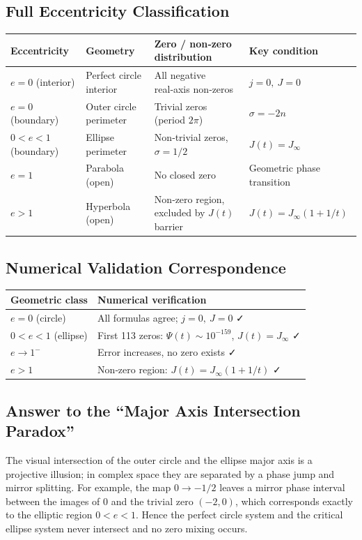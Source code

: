 \documentclass[12pt,a4paper]{article}
\begin{document}
\subsection{Full Eccentricity Classification}\label{app:A2}

\begin{tabularx}{\textwidth}{lXlX}
\toprule
Eccentricity & Geometry & Zero / non‑zero distribution & Key condition \\
\midrule
$e=0$ (interior) & Perfect circle interior & All negative real‑axis non‑zeros & $j=0,\ J=0$ \\
$e=0$ (boundary) & Outer circle perimeter & Trivial zeros (period $2\pi$) & $\sigma = -2n$ \\
$0<e<1$ (boundary) & Ellipse perimeter & Non‑trivial zeros, $\sigma=1/2$ & $J(t)=J_\infty$ \\
$e=1$ & Parabola (open) & No closed zero & Geometric phase transition \\
$e>1$ & Hyperbola (open) & Non‑zero region, excluded by $J(t)$ barrier & $J(t)=J_\infty(1+1/t)$ \\
\bottomrule
\end{tabularx}

\subsection{Numerical Validation Correspondence}\label{app:A3}

\begin{tabularx}{\textwidth}{lX}
\toprule
Geometric class & Numerical verification \\
\midrule
$e=0$ (circle) & All formulas agree; $j=0,\ J=0$ ✓ \\
$0<e<1$ (ellipse) & First 113 zeros: $\Psi(t)\sim10^{-159}$, $J(t)=J_\infty$ ✓ \\
$e\to1^-$ & Error increases, no zero exists ✓ \\
$e>1$ & Non‑zero region: $J(t)=J_\infty(1+1/t)$ ✓ \\
\bottomrule
\end{tabularx}

\subsection{Answer to the ``Major Axis Intersection Paradox''}\label{app:A4}
The visual intersection of the outer circle and the ellipse major axis is a projective illusion; in complex space they are separated by a phase jump and mirror splitting. For example, the map $0\to -1/2$ leaves a mirror phase interval between the images of $0$ and the trivial zero $(-2,0)$, which corresponds exactly to the elliptic region $0<e<1$. Hence the perfect circle system and the critical ellipse system never intersect and no zero mixing occurs.
\end{document}
